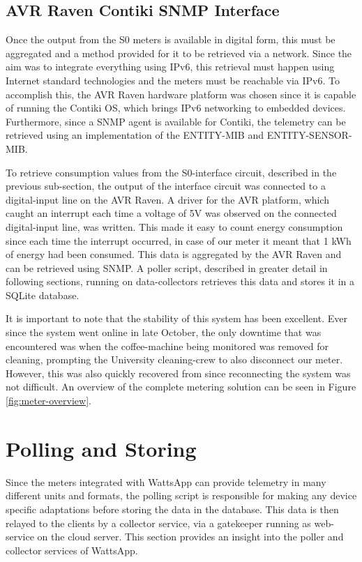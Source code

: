 \documentclass[10pt, conference, compsocconf, english]{IEEEtran}
\begin{document}
\subsection{AVR Raven Contiki SNMP Interface}

\label{subsec:avr-contiki-snmp}

Once the output from the S0 meters is available in digital form, this
must be aggregated and a method provided for it to be retrieved via
a network. Since the aim was to integrate everything using IPv6, this
retrieval must happen using Internet standard technologies and the
meters must be reachable via IPv6. To accomplish this, the AVR Raven
hardware platform was chosen since it is capable of running the Contiki
OS, which brings IPv6 networking to embedded devices. Furthermore,
since a SNMP agent is available for Contiki, the telemetry can be
retrieved using an implementation of the ENTITY-MIB and ENTITY-SENSOR-MIB.

To retrieve consumption values from the S0-interface circuit, described
in the previous sub-section, the output of the interface circuit was
connected to a digital-input line on the AVR Raven. A driver for the
AVR platform, which caught an interrupt each time a voltage of 5V
was observed on the connected digital-input line, was written. This
made it easy to count energy consumption since each time the interrupt
occurred, in case of our meter it meant that 1 kWh of energy had been
consumed. This data is aggregated by the AVR Raven and can be retrieved
using SNMP. A poller script, described in greater detail in following
sections, running on data-collectors retrieves this data and stores
it in a SQLite database.

It is important to note that the stability of this system has been
excellent. Ever since the system went online in late October, the
only downtime that was encountered was when the coffee-machine being
monitored was removed for cleaning, prompting the University cleaning-crew
to also disconnect our meter. However, this was also quickly recovered
from since reconnecting the system was not difficult. An overview
of the complete metering solution can be seen in Figure \ref{fig:meter-overview}.


\section{Polling and Storing}

Since the meters integrated with WattsApp can provide telemetry in
many different units and formats, the polling script is responsible
for making any device specific adaptations before storing the data
in the database. This data is then relayed to the clients by a collector
service, via a gatekeeper running as web-service on the cloud server.
This section provides an insight into the poller and collector services
of WattsApp.
\end{document}
